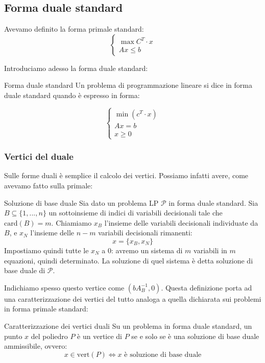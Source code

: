 \documentclass[a4paper,11pt]{article}
\begin{document}
\subsection{Forma duale standard}
Avevamo definito la forma primale standard:
\[
	\begin{cases}
		\max{C^T \cdot x} \\
		Ax \leq b
	\end{cases}
\]

Introduciamo adesso la forma duale standard:
\begin{definition}{Forma duale standard}
	Un problema di programmazione lineare si dice in forma duale standard quando è espresso in forma:
	
	\[
		\begin{cases}
			\min(c^T \cdot x) \\
			Ax = b \\
			x \geq 0
		\end{cases}
	\]

\end{definition}

\subsubsection{Vertici del duale}
Sulle forme duali è semplice il calcolo dei vertici. 
Possiamo infatti avere, come avevamo fatto sulla primale:
\begin{definition}{Soluzione di base duale}
	Sia dato un problema LP $\mathcal{P}$ in forma duale standard.
	Sia $B \subseteq \{ 1, ..., n \}$ un sottoinsieme di indici di variabili decisionali tale che $\mathrm{card}(B) = m$.
	Chiamiamo $x_B$ l'insieme delle variabili decisionali individuate da $B$, e $x_N$ l'insieme delle $n - m$ variabili decisionali rimanenti:
	$$ x = \{x_B, x_N\}$$
	Impostiamo quindi tutte le $x_N$ a 0: avremo un sistema di $m$ variabili in $m$ equazioni, quindi determinato.
	La soluzione di quel sistema è detta soluzione di base duale di $\mathcal{P}$.
\end{definition}

Indichiamo spesso questo vertice come $(bA_B^{-1}, 0)$.
Questa definizione porta ad una caratterizzazione dei vertici del tutto analoga a quella dichiarata sui problemi in forma primale standard:

\begin{theorem}{Caratterizzazione dei vertici duali}
	Su un problema in forma duale standard, un punto $x$ del poliedro $P$ è un vertice di $P$ se e solo se è una soluzione di base duale ammissibile, ovvero:
	$$ 
	x \in \mathrm{vert}(P) \Leftrightarrow \text{$x$ è soluzione di base duale}
	$$
\end{theorem}
\end{document}
